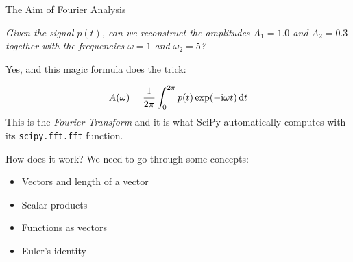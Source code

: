 
\begin{frame}{The Aim of Fourier Analysis}
%
\begin{center}
	\emph{Given the signal $p(t)$, can we reconstruct the amplitudes $A_1 = 1.0$ and $A_2 = 0.3$ together with the frequencies $\omega = 1$ and $\omega_2 = 5$?}
\end{center}
%
\begin{center}
	Yes, and this magic formula does the trick:
\end{center}
%
\begin{align*}
	A(\omega) = \frac{1}{2\pi} \int_{0}^{2\pi} p(t) \exp(-\mathrm{i} \omega t) \dd{t}
\end{align*}
%
This is the \emph{Fourier Transform} and it is what SciPy automatically computes with its \texttt{scipy.fft.fft} function.
%
\end{frame}


\begin{frame}{How does it work?}
%
We need to go through some concepts:
\begin{itemize}
\item Vectors and length of a vector
\item Scalar products
\item Functions as vectors
\item Euler's identity
\end{itemize}
%
\end{frame}


